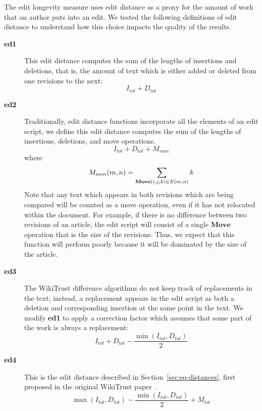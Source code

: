 The edit longevity measure uses edit distance as a proxy for the
amount of work that an author puts into an edit.
We tested the following definitions of edit distance to understand
how this choice impacts the quality of the results.
%
\begin{description}

\item[\textbf{ed1}] This edit distance computes the sum of the lengths
    of insertions and deletions, that is, the amount of text which
    is either added or deleted from one revisions to the next:
    \begin{equation*}
    I_{tot} + D_{tot}
    \end{equation*}

\item[\textbf{ed2}] Traditionally, edit distance functions incorporate
    all the elements of an edit script, we define
    this edit distance computes the sum of the lengths
    of insertions, deletions, and move operations.
    \begin{equation*}
    I_{tot} + D_{tot} + M_{sum}
    \end{equation*}
    where
    \begin{equation*}
    M_{sum}(m,n) = \sum_{\mathbf{Move}(i, j, k) \in E(m,n)} k \\
    \end{equation*}
    Note that any text which appears in both revisions which are being
    compared will be counted as a move operation, even if it has not
    relocated within the document.
    For example, if there is no difference between two revisions of
    an article, the edit script will consist of a single $\mathbf{Move}$
    operation that is the size of the revisions.
    Thus, we expect that this function will perform poorly because
    it will be dominated by the size of the article.

\item[\textbf{ed3}]
    The WikiTrust difference algorithms do not keep track of replacements
    in the text; instead, a replacement appears in the edit script as
    both a deletion and corresponding insertion at the same point in the text.
    We modify \textbf{ed1} to apply a correction factor which
    assumes that some part of the work is always a replacement:
    \begin{equation*}
    I_{tot} + D_{tot} - \frac{\min(I_{tot}, D_{tot})}{2}
    \end{equation*}

\item[\textbf{ed4}] This is the edit distance described in
    Section~\ref{sec:eq-distances}, first proposed in
    the original WikiTrust paper~\cite{Adler2007}.
    \begin{equation*}
    \max(I_{tot}, D_{tot}) - \frac{\min(I_{tot}, D_{tot})}{2}
		+ M_{tot}
    \end{equation*}


\end{description}
